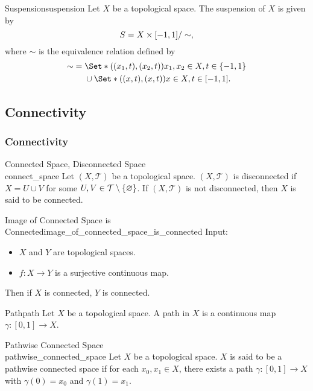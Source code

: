 \documentclass{article}
\begin{document}
\begin{definition}{Suspension}{suspension}
    Let $X$ be a topological space.
    The suspension of $X$ is given by
    \[ S = X \times \qty[-1, 1] / \sim, \]
    where $\sim$ is the equivalence relation defined by
    \begin{align*}
        {\sim} &= \Set*{((x_1, t), (x_2, t))}{x_1,x_2\in X, t\in\qty{-1,1}} \\
        &\phantom{{}={}} \cup \Set*{((x, t), (x, t))}{x\in X, t\in\qty[-1,1]}.
    \end{align*}
\end{definition}

\subsection{Connectivity}

\subsubsection{Connectivity}

\begin{definition}{Connected Space, Disconnected Space\\ }{connect_space}
    Let $(X,\mathcal{T})$ be a topological space.
    $(X,\mathcal{T})$ is disconnected if $X = U\cup V$ for some $U,V\in \mathcal{T}\setminus\qty{\varnothing}$.
    If $(X,\mathcal{T})$ is not disconnected, then $X$ is said to be connected.
\end{definition}

\begin{theorem}{Image of Connected Space is Connected}{image_of_connected_space_is_connected}
    Input:
    \begin{itemize}
        \item $X$ and $Y$ are topological spaces.
        \item $f:X\rightarrow Y$ is a surjective continuous map.
    \end{itemize}
    Then if $X$ is connected, $Y$ is connected.
\end{theorem}

\begin{definition}{Path}{path}
    Let $X$ be a topological space.
    A path in $X$ is a continuous map $\gamma:[0,1]\rightarrow X$.
\end{definition}

\begin{definition}{Pathwise Connected Space\\ }{pathwise_connected_space}
    Let $X$ be a topological space.
    $X$ is said to be a pathwise connected space if for each $x_0,x_1\in X$, there exists a path $\gamma:[0,1]\rightarrow X$ with $\gamma(0) = x_0$ and $\gamma(1) = x_1$.
\end{definition}
\end{document}

